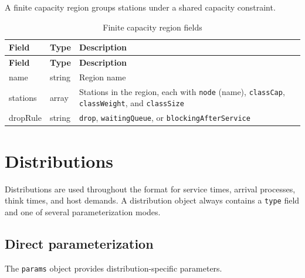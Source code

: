 A finite capacity region groups stations under a shared capacity constraint.

\begin{footnotesize}
\begin{longtable}{|T{2.2cm}|T{3.2cm}|D{7.5cm}|}
\caption{Finite capacity region fields}\label{tab:json-fcr}
\\\hline
\textbf{Field} & \textbf{Type} & \textbf{Description} \\\hline
\endfirsthead
\hline \textbf{Field} & \textbf{Type} & \textbf{Description} \\\hline
\endhead
\hline
\endfoot
name      & string & Region name \\\hline
stations  & array  & Stations in the region, each with \texttt{node} (name), \texttt{classCap}, \texttt{classWeight}, and \texttt{classSize} \\\hline
dropRule  & string & \texttt{drop}, \texttt{waitingQueue}, or \texttt{blockingAfterService} \\\hline
\end{longtable}
\end{footnotesize}

\section{Distributions}
\label{json:distributions}

Distributions are used throughout the format for service times, arrival processes, think times, and host demands. A distribution object always contains a \texttt{type} field and one of several parameterization modes.

\subsection{Direct parameterization}
\label{json:dist-params}

The \texttt{params} object provides distribution-specific parameters.

